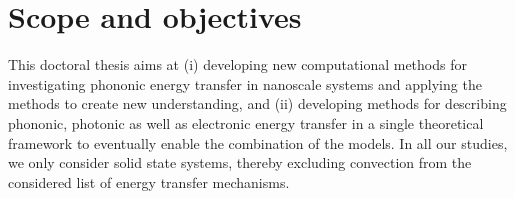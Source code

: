



\section{Scope and objectives}

This doctoral thesis aims at (i) developing new computational methods for investigating phononic energy transfer in nanoscale systems and applying the methods to create new understanding, and (ii) developing methods for describing phononic, photonic as well as electronic energy transfer in a single theoretical framework to eventually enable the combination of the models. In all our studies, we only consider solid state systems, thereby excluding convection from the considered list of energy transfer mechanisms. %

